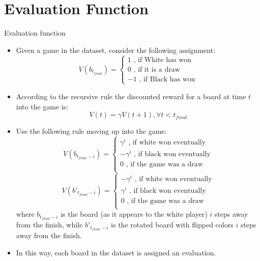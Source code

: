 \documentclass[9pt, unknownkeysallowed]{beamer}
\begin{document}
\section{Evaluation Function}
\begin{frame}{Evaluation function}
\begin{tiny}
\begin{itemize}
 \item Given a game in the dataset, consider the following assignment:
 \[V(b_{t_{final}}) = \begin{cases}
1 \text{ , if White has won}\\
0 \text{ , if it is a draw}\\
-1 \text{ , if Black has won}
\end{cases}\]
\item According to the recursive rule the discounted reward 
for a board at time $t$ 
into the game is:
\[V(t) = \gamma V(t+1) , \forall t<t_{final}\]
\item Use the following rule moving up into the game:
\[V(b_{t_{final}-i}) = \begin{cases}
		\gamma^{i} \text{ , if white won eventually}\\
                -\gamma^{i} \text{ , if black won eventually}\\
                0 \text{ , if the game was a draw}\\
               \end{cases}\]
\[V(b'_{t_{final}-i}) = \begin{cases}
		-\gamma^{i} \text{ , if white won eventually}\\
                \gamma^{i} \text{ , if black won eventually}\\
                0 \text{ , if the game was a draw}\\
               \end{cases}\]
where $b_{t_{final}-i}$ is the board (as it appears to the white player) $i$ 
steps away from the finish, while $b'_{t_{final}-i}$ is the rotated board with 
flipped colors $i$ steps away from the finish.
\item In this way, each board in the dataset is assigned an evaluation.
\end{itemize}
\end{tiny}
\end{frame}
\end{document}
